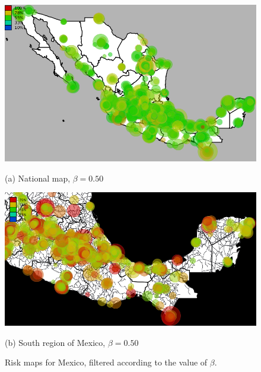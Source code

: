 \begin{figure}[p]
	\caption{Risk maps for Mexico, filtered according to the value of $\beta$.}\label{fig:mapas_mexico}
	\begin{minipage}{.6\linewidth}
		\centering
		\includegraphics[width=\columnwidth,keepaspectratio]
		{figures/mexico_usuarios_volumen_circulos_allday_beta--50_min_volume--80_mexico_/mexico_usuarios_volumen_circulos_allday_beta--50_min_volume--80_mexico_}

		(a) National map, $\beta = 0.50$
	\end{minipage}
	\begin{minipage}{.6\linewidth}
		\centering
		\includegraphics[width=\columnwidth,keepaspectratio]
		{figures/sur_usuarios_volumen_circulos_allday_beta--50_min_volume--80_mexico_/sur_usuarios_volumen_circulos_allday_beta--50_min_volume--80_mexico_}

		(b) South region of Mexico, $\beta = 0.50$
	\end{minipage}


\end{figure}
